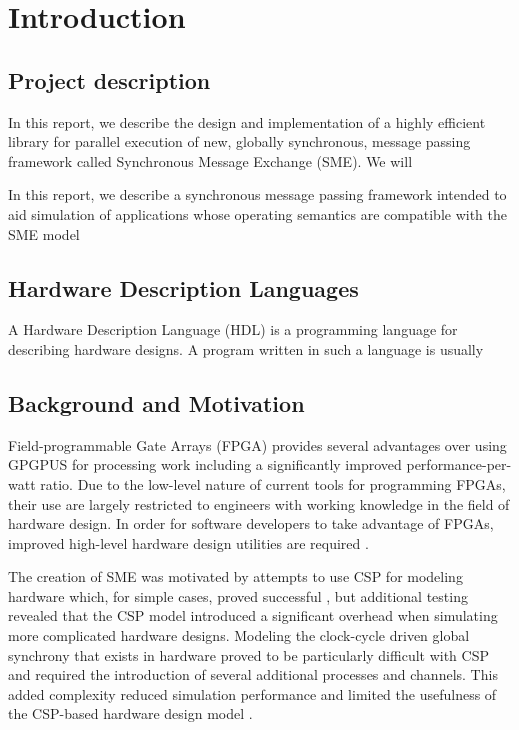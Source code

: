 \chapter{Introduction}

\section{Project description}
In this report, we describe the design and implementation of a highly
efficient library for parallel execution of new, globally synchronous,
message passing framework called Synchronous Message Exchange
(SME). We will

In this report, we describe a synchronous message passing framework
intended to aid simulation of applications whose operating semantics
are compatible with the SME model

\section{Hardware Description Languages}
A Hardware Description Language (HDL) is a programming language for
describing hardware designs. A program written in such a language is
usually

\section{Background and Motivation}
Field-programmable Gate Arrays (FPGA) provides several advantages over
using GPGPUS for processing work including a significantly improved
performance-per-watt ratio. Due to the low-level nature of current
tools for programming FPGAs, their use are largely restricted to
engineers with working knowledge in the field of hardware design. In
order for software developers to take advantage of FPGAs, improved
high-level hardware design utilities are required \cite{bacon2013fpga}.

The creation of SME was motivated by attempts to use CSP for modeling
hardware which, for simple cases, proved successful
\cite{rehr2013bpu}, but additional testing revealed that the CSP model
introduced a significant overhead when simulating more complicated
hardware designs. Modeling the clock-cycle driven global synchrony
that exists in hardware proved to be particularly difficult with CSP
and required the introduction of several additional processes and
channels. This added complexity reduced simulation performance and
limited the usefulness of the CSP-based hardware design model \cite{vinter2014synchronous}.

